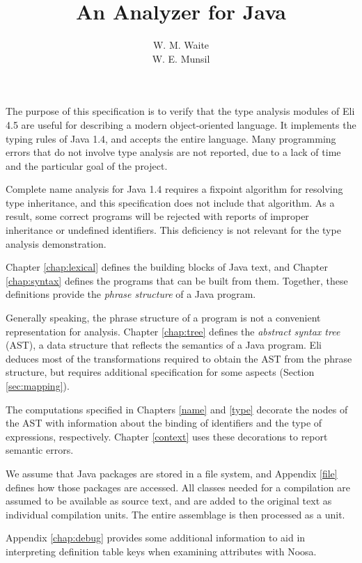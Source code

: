 \title{An Analyzer for Java}
\author{W. M. Waite \\ W. E. Munsil}
\maketitle

The purpose of this specification is to verify that the type analysis
modules of Eli 4.5 are useful for describing a modern object-oriented
language.
It implements the typing rules of Java 1.4, and accepts the entire
language.
Many programming errors that do not involve type analysis are not reported,
due to a lack of time and the particular goal of the project.

Complete name analysis for Java 1.4 requires a fixpoint algorithm for
resolving type inheritance, and this specification does not include that
algorithm.
As a result, some correct programs will be rejected with reports of
improper inheritance or undefined identifiers.
This deficiency is not relevant for the type analysis demonstration.

Chapter \ref{chap:lexical} defines the building blocks of Java text, and
Chapter \ref{chap:syntax} defines the programs that can be built from them.
Together, these definitions provide the \emph{phrase structure} of a Java
program.

Generally speaking, the phrase structure of a program is not a convenient
representation for analysis.
Chapter \ref{chap:tree} defines the \emph{abstract syntax tree} (AST),
a data structure that reflects the semantics of a Java program.
Eli deduces most of the transformations required to obtain the AST from the
phrase structure, but requires additional specification for some aspects
(Section \ref{sec:mapping}).

The computations specified in Chapters \ref{name} and \ref{type}
decorate the nodes of the AST with information about
the binding of identifiers and the type of expressions, respectively.
Chapter \ref{context} uses these decorations to report semantic errors.

We assume that Java packages are stored in a file system, and
Appendix \ref{file} defines how those packages are accessed.
All classes needed for a compilation are assumed to be available as source
text, and are added to the original text as individual compilation units.
The entire assemblage is then processed as a unit.

Appendix \ref{chap:debug} provides some additional information to aid in
interpreting definition table keys when examining attributes with Noosa.

